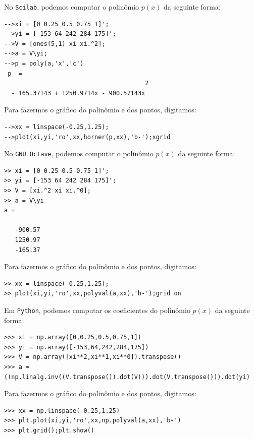 \begin{sol}
\ifisscilab
No \verb+Scilab+, podemos computar o polinômio $p(x)$ da seguinte forma:
\begin{verbatim}
-->xi = [0 0.25 0.5 0.75 1]';
-->yi = [-153 64 242 284 175]';
-->V = [ones(5,1) xi xi.^2];
-->a = V\yi;
-->p = poly(a,'x','c') 
 p  =
                                       2  
  - 165.37143 + 1250.9714x - 900.57143x   
\end{verbatim}
Para fazermos o gráfico do polinômio e dos pontos, digitamos:
\begin{verbatim}
-->xx = linspace(-0.25,1.25); 
-->plot(xi,yi,'ro',xx,horner(p,xx),'b-');xgrid
\end{verbatim}
\fi
\ifisoctave
No \verb+GNU Octave+, podemos computar o polinômio $p(x)$ da seguinte forma:
\begin{verbatim}
>> xi = [0 0.25 0.5 0.75 1]';
>> yi = [-153 64 242 284 175]';
>> V = [xi.^2 xi xi.^0];
>> a = V\yi
a =

   -900.57
   1250.97
   -165.37
\end{verbatim}
Para fazermos o gráfico do polinômio e dos pontos, digitamos:
\begin{verbatim}
>> xx = linspace(-0.25,1.25);
>> plot(xi,yi,'ro',xx,polyval(a,xx),'b-');grid on
\end{verbatim}
\fi
\ifispython
Em \verb+Python+, podemos computar os coeficientes do polinômio $p(x)$ da seguinte forma:
\begin{verbatim}
>>> xi = np.array([0,0.25,0.5,0.75,1])
>>> yi = np.array([-153,64,242,284,175])
>>> V = np.array([xi**2,xi**1,xi**0]).transpose()
>>> a = ((np.linalg.inv((V.transpose()).dot(V))).dot(V.transpose())).dot(yi)
\end{verbatim}
Para fazermos o gráfico do polinômio e dos pontos, digitamos:
\begin{verbatim}
>>> xx = np.linspace(-0.25,1.25)
>>> plt.plot(xi,yi,'ro',xx,np.polyval(a,xx),'b-')
>>> plt.grid();plt.show()
\end{verbatim}
\fi
\end{sol}

